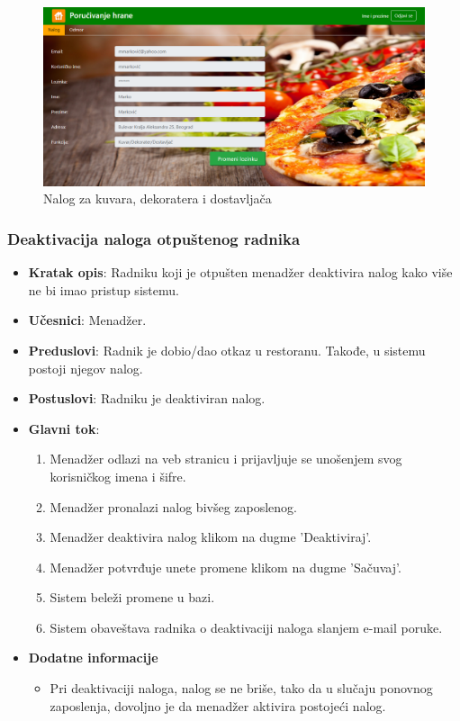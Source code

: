  \begin{figure}[ht]
    \leavevmode
    \begin{center}
    \includegraphics[height=0.3\textheight]{slike/nalog.png}
    \end{center}
    \caption{Nalog za kuvara, dekoratera i dostavljača} %
    \label{fig:slika_nalozi}
\end{figure}

 \subsubsection{Deaktivacija naloga otpuštenog radnika}
 \begin{itemize}
    \item \textbf{Kratak opis}:
   Radniku koji je otpušten menadžer deaktivira nalog kako više ne bi imao pristup sistemu.
    \item \textbf{Učesnici}:
    Menadžer.
    \item \textbf{Preduslovi}:
    Radnik je dobio/dao otkaz u restoranu. Takođe, u sistemu postoji njegov nalog.
    \item \textbf{Postuslovi}:
    Radniku je deaktiviran nalog. 
    \item \textbf{Glavni tok}:
    \begin{enumerate}
        \item Menadžer odlazi na veb stranicu i prijavljuje se unošenjem svog korisničkog imena i šifre.
        \item Menadžer pronalazi nalog bivšeg zaposlenog.
        \item Menadžer deaktivira nalog klikom na dugme 'Deaktiviraj'.
        \item Menadžer potvrđuje unete promene klikom na dugme 'Sačuvaj'.
        \item Sistem beleži promene u bazi.
        \item Sistem obaveštava radnika o deaktivaciji naloga slanjem e-mail poruke.
    \end{enumerate}
\item \textbf{Dodatne informacije}
 \begin{itemize}
     \item Pri deaktivaciji naloga, nalog se ne briše, tako da u slučaju ponovnog zaposlenja, dovoljno je da menadžer aktivira postojeći nalog.
 \end{itemize}
 \end{itemize}
 
